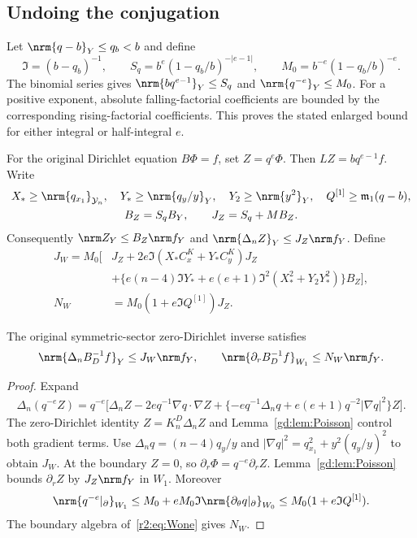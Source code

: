 \subsection{Undoing the conjugation}\label{gd:sec:unconjugation}
Let $\nrm{q-b}_Y\le q_b<b$ and define
\begin{equation}\label{gd:eq:source-multipliers}
 \mathfrak I=(b-q_b)^{-1},\qquad
 S_q=b^e(1-q_b/b)^{-|e-1|},\qquad
 M_0=b^{-e}(1-q_b/b)^{-e}.
\end{equation}
The binomial series gives
$\nrm{bq^{e-1}}_Y\le S_q$ and $\nrm{q^{-e}}_Y\le M_0$.
For a positive exponent, absolute falling-factorial coefficients are
bounded by the corresponding rising-factorial coefficients.
This proves the stated enlarged bound for either integral or
half-integral $e$.

For the original Dirichlet equation $B\Phi=f$, set $Z=q^e\Phi$.
Then $LZ=bq^{e-1}f$. Write
\[
 \begin{gathered}
 X_*\ge\nrm{q_{x_1}}_{\mathcal Y_n},\quad Y_*\ge\nrm{q_y/y}_Y,\quad
 Y_2\ge\nrm{y^2}_Y,\quad Q^{[1]}\ge\mathfrak m_1(q-b),\\
 B_Z=S_qB_Y,\qquad J_Z=S_q+MB_Z .
 \end{gathered}
\]
Consequently $\nrm Z_Y\le B_Z\nrm f_Y$ and
$\nrm{\Delta_nZ}_Y\le J_Z\nrm f_Y$.
Define
\begin{equation}\label{gd:eq:JW}
 \begin{split}
 J_W=M_0\bigl[&
 J_Z+2e\mathfrak I(X_*C_x^K+Y_*C_y^K)J_Z\\
 &+\{e(n-4)\mathfrak I Y_*
       +e(e+1)\mathfrak I^2(X_*^2+Y_2Y_*^2)\}B_Z\bigr],\\
 N_W&=M_0(1+e\mathfrak I Q^{[1]})J_Z .
 \end{split}
\end{equation}

\begin{proposition}\label{gd:prop:original-inverse}
The original symmetric-sector zero-Dirichlet inverse satisfies
\[
 \nrm{\Delta_nB_D^{-1}f}_Y\le J_W\nrm f_Y,\qquad
 \nrm{\partial_rB_D^{-1}f}_{W_1}\le N_W\nrm f_Y .
\]
\end{proposition}
\begin{proof}
Expand
\[
 \begin{split}
 \Delta_n(q^{-e}Z)=q^{-e}\bigl[
 \Delta_nZ-2e q^{-1}\nabla q\cdot\nabla Z
 +\{-e q^{-1}\Delta_nq
       +e(e+1)q^{-2}|\nabla q|^2\}Z\bigr].
 \end{split}
\]
The zero-Dirichlet identity $Z=K_n^D\Delta_nZ$ and
Lemma~\ref{gd:lem:Poisson} control both gradient terms.
Use $\Delta_nq=(n-4)q_y/y$ and
$|\nabla q|^2=q_{x_1}^2+y^2(q_y/y)^2$ to obtain $J_W$.
At the boundary $Z=0$, so $\partial_r\Phi=q^{-e}\partial_rZ$.
Lemma~\ref{gd:lem:Poisson} bounds $\partial_rZ$ by $J_Z\nrm f_Y$
in $W_1$. Moreover
\[
 \nrm{q^{-e}|_\partial}_{W_1}
 \le M_0+eM_0\mathfrak I\nrm{\partial_\theta q|_\partial}_{W_0}
 \le M_0(1+e\mathfrak I Q^{[1]}).
\]
The boundary algebra of~\eqref{r2:eq:Wone} gives $N_W$.
\end{proof}

